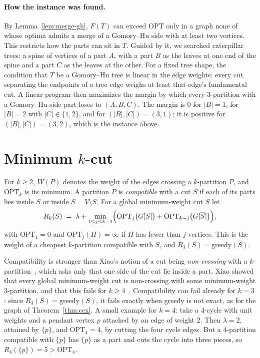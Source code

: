 \documentclass[preprint,12pt]{elsarticle}
\theoremstyle{definition}
\newcommand{\OPT}{\mathrm{OPT}}
\newcommand{\greedy}{\mathrm{greedy}}
\newcommand{\Sbar}{\overline{S}}
\begin{document}
\paragraph{How the instance was found.}
By Lemma~\ref{lem:merge-gh}, $F(T)$ can exceed $\OPT$ only in a graph none of whose optima admits a
merge of a Gomory--Hu side with at least two vertices. This restricts how the parts can sit in $T$.
Guided by it, we searched caterpillar trees: a spine of vertices of a part $A$, with a part $B$ as the
leaves at one end of the spine and a part $C$ as the leaves at the other. For a fixed tree shape, the condition that $T$ be a
Gomory--Hu tree is linear in the edge weights: every cut separating the endpoints of a tree edge weighs
at least that edge's fundamental cut. A linear program then maximizes the margin by which every
3-partition with a Gomory--Hu-side part loses to $(A,B,C)$. The margin is $0$ for $|B|=1$, for
$|B|=2$ with $|C|\in\{1,2\}$, and for $(|B|,|C|)=(3,1)$; it is positive for $(|B|,|C|)=(3,2)$, which is
the instance above.

\section{Minimum $k$-cut}\label{sec:kcut}

For $k\ge2$, $W(P)$ denotes the weight of the edges crossing a $k$-partition $P$, and $\OPT_k$ is its
minimum. A partition $P$ is \emph{compatible} with a cut $S$ if each of its parts lies inside $S$ or
inside $\Sbar=V\setminus S$. For a global minimum-weight cut $S$ let
\[
  R_k(S) \;=\; \lambda + \min_{1\le j\le k-1}\Bigl(\OPT_j\bigl(G[S]\bigr)+\OPT_{k-j}\bigl(G[\Sbar]\bigr)\Bigr),
\]
with $\OPT_1=0$ and $\OPT_j(H)=\infty$ if $H$ has fewer than $j$ vertices. This is the weight of a
cheapest $k$-partition compatible with $S$, and $R_3(S)=\greedy(S)$.

Compatibility is stronger than Xiao's notion of a cut being \emph{non-crossing} with a
$k$-partition~\cite[Definition~2]{Xiao2008}, which asks only that one side of the cut lie inside a
part. Xiao showed that every global minimum-weight cut is non-crossing with some minimum-weight
3-partition, and that this fails for $k\ge4$~\cite[Lemmas~5 and~9]{Xiao2008}. Compatibility can fail
already for $k=3$: since $R_3(S)=\greedy(S)$, it fails exactly when greedy is not exact, as for the
graph of Theorem~\ref{thm:cex}. A small example for $k=4$: take a 4-cycle with unit weights and a
pendant vertex $p$ attached by an edge of weight $2$. Then $\lambda=2$, attained by $\{p\}$, and
$\OPT_4=4$, by cutting the four cycle edges. But a 4-partition compatible with $\{p\}$ has $\{p\}$ as a
part and cuts the cycle into three pieces, so $R_4(\{p\})=5>\OPT_4$.
\end{document}
